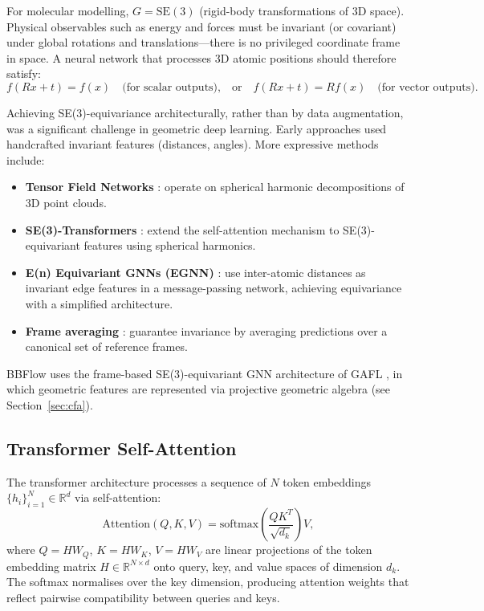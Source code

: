 \documentclass[12pt,a4paper]{article}
\newcommand{\SE}{\mathrm{SE}(3)}
\begin{document}
For molecular modelling, $G = \SE$ (rigid-body transformations of 3D space).  Physical
observables such as energy and forces must be invariant (or covariant) under global rotations
and translations---there is no privileged coordinate frame in space.  A neural network
that processes 3D atomic positions should therefore satisfy:
\begin{equation}
  f(R x + t) = f(x) \quad \text{(for scalar outputs),}
  \quad \text{or} \quad
  f(R x + t) = R f(x) \quad \text{(for vector outputs).}
\end{equation}

Achieving SE(3)-equivariance architecturally, rather than by data augmentation, was a
significant challenge in geometric deep learning.  Early approaches used handcrafted invariant
features (distances, angles).  More expressive methods include:
\begin{itemize}
  \item \textbf{Tensor Field Networks} \citep{thomas2018}: operate on spherical harmonic
    decompositions of 3D point clouds.
  \item \textbf{SE(3)-Transformers} \citep{fuchs2020}: extend the self-attention mechanism to
    SE(3)-equivariant features using spherical harmonics.
  \item \textbf{E(n) Equivariant GNNs (EGNN)} \citep{satorras2021}: use inter-atomic distances
    as invariant edge features in a message-passing network, achieving equivariance with
    a simplified architecture.
  \item \textbf{Frame averaging} \citep{puny2022}: guarantee invariance by averaging predictions
    over a canonical set of reference frames.
\end{itemize}
BBFlow uses the frame-based SE(3)-equivariant GNN architecture of GAFL \citep{wagner2024gafl},
in which geometric features are represented via projective geometric algebra (see
Section~\ref{sec:cfa}).

\subsection{Transformer Self-Attention}
\label{sec:attention}

The transformer \citep{vaswani2017} architecture processes a sequence of $N$ token embeddings
$\{h_i\}_{i=1}^N \in \mathbb{R}^d$ via self-attention:
\begin{equation}
  \mathrm{Attention}(Q, K, V) = \mathrm{softmax}\!\left(\frac{QK^T}{\sqrt{d_k}}\right) V,
\end{equation}
where $Q = HW_Q$, $K = HW_K$, $V = HW_V$ are linear projections of the token embedding
matrix $H \in \mathbb{R}^{N \times d}$ onto query, key, and value spaces of dimension $d_k$.
The softmax normalises over the key dimension, producing attention weights that reflect
pairwise compatibility between queries and keys.
\end{document}
